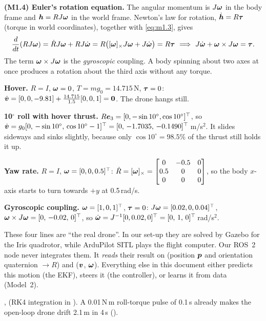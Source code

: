 \textbf{(M1.4) Euler's rotation equation.} The angular momentum is $J\bm{\omega}$ in the body frame and $\bm h=RJ\bm{\omega}$ in the
world frame. Newton's law for rotation, $\dot{\bm h}=R\bm{\tau}$ (torque in world coordinates), together with \eqref{eq:m1.3}, gives
\[
  \frac{d}{dt}(RJ\bm{\omega})=\dot RJ\bm{\omega}+RJ\dot{\bm{\omega}}=R\big([\bm{\omega}]_{\times}J\bm{\omega}+J\dot{\bm{\omega}}\big)=R\bm{\tau}
  \ \Longrightarrow\ J\dot{\bm{\omega}}+\bm{\omega}\times J\bm{\omega}=\bm{\tau} .
\]
The term $\bm{\omega}\times J\bm{\omega}$ is the \emph{gyroscopic} coupling. A body spinning about two axes at once produces a
rotation about the third axis without any torque.

\begin{toybox}[hover, tilt and gyroscopic coupling ($m=1.5$, $J=\diag(0.02,0.02,0.04)$)]
\textbf{Hover.} $R=I$, $\bm{\omega}=0$, $T=mg_0=14.715$\,N, $\bm{\tau}=0$:
$\dot{\bm{v}}=[0,0,-9.81]+\frac{14.715}{1.5}[0,0,1]=\bm 0$. The drone hangs still.

\textbf{10$^\circ$ roll with hover thrust.} $R\bm{e}_3=[0,-\sin10^\circ,\cos10^\circ]^\top$, so
$\dot{\bm{v}}=g_0[0,\,-\sin10^\circ,\,\cos10^\circ-1]^\top=[0,\,-1.7035,\,-0.1490]^\top$\,m/s$^2$.
It slides sideways and sinks slightly, because only $\cos10^\circ=98.5\%$ of the thrust still holds it up.

\textbf{Yaw rate.} $R=I$, $\bm{\omega}=[0,0,0.5]^\top$: $\dot R=[\bm{\omega}]_{\times}=\begin{bmatrix}0&-0.5&0\\0.5&0&0\\0&0&0\end{bmatrix}$,
so the body $x$-axis starts to turn towards $+y$ at 0.5\,rad/s.

\textbf{Gyroscopic coupling.} $\bm{\omega}=[1,0,1]^\top$, $\bm{\tau}=0$: $J\bm{\omega}=[0.02,0,0.04]^\top$,
$\bm{\omega}\times J\bm{\omega}=[0,\,-0.02,\,0]^\top$, so $\dot{\bm{\omega}}=J^{-1}[0,0.02,0]^\top=[0,\,1,\,0]^\top$\,rad/s$^2$.
\end{toybox}

\begin{projbox}
These four lines are ``the real drone''. In our set-up they are solved by Gazebo for the Iris quadrotor, while
ArduPilot SITL plays the flight computer. Our ROS~2 node never integrates them. It \emph{reads} their result on
 (position $\bm{p}$ and orientation quaternion $\to R$) and
 ($\bm{v}$, $\bm{\omega}$). Everything else in this document either predicts this motion
(the EKF), steers it (the controller), or learns it from data (Model~2).
\end{projbox}

\begin{codebox}
\intoy {}, 
(RK4 integration in ). A 0.01\,N\,m roll-torque pulse of 0.1\,s already makes the open-loop
drone drift 2.1\,m in 4\,s ().
\end{codebox}

